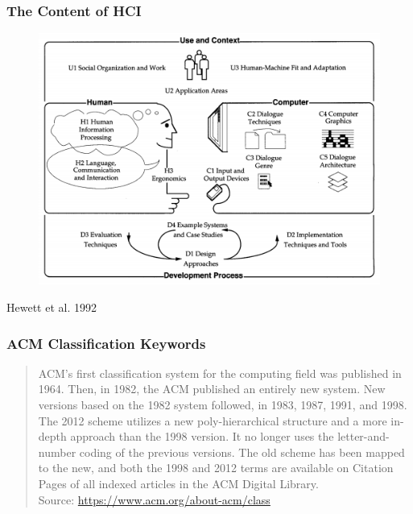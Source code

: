 \documentclass[screen, aspectratio=169]{beamer}
\begin{document}
\begin{frame}
\frametitle{The Content of HCI}
\begin{figure}
\includegraphics[scale=0.19]{img/content-HCI-1992.png}
\end{figure}
{\small Hewett et al. 1992 \cite{Hewett.1992.curricula}}
\end{frame}
%
\begin{frame}
\frametitle{ACM Classification Keywords}
\begin{quote}
ACM's first classification system for the computing field was published in 1964. Then, in 1982, the ACM published an entirely new system. New versions based on the 1982 system followed, in 1983, 1987, 1991, and 1998. The 2012 scheme utilizes a new poly-hierarchical structure and a more in-depth approach than the 1998 version. It no longer uses the letter-and-number coding of the previous versions. The old scheme has been mapped to the new, and both the 1998 and 2012 terms are available on Citation Pages of all indexed articles in the ACM Digital Library.\\
Source: \url{https://www.acm.org/about-acm/class}
\end{quote}
\end{frame}
%
\end{document}
